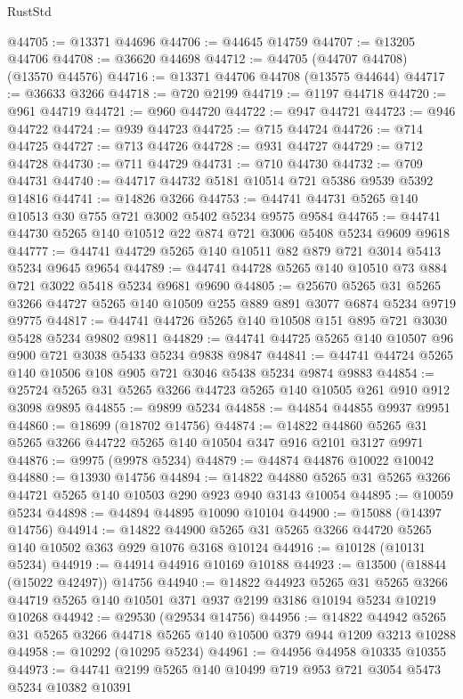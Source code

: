 \begin{lexlean}{RustStd}
\begin{coremodule}
@44705 := @13371 @44696
@44706 := @44645 @14759
@44707 := @13205 @44706
@44708 := @36620 @44698
@44712 := @44705 (@44707 @44708) (@13570 @44576)
@44716 := @13371 @44706 @44708 (@13575 @44644)
@44717 := @36633 @3266
@44718 := @720 @2199
@44719 := @1197 @44718
@44720 := @961 @44719
@44721 := @960 @44720
@44722 := @947 @44721
@44723 := @946 @44722
@44724 := @939 @44723
@44725 := @715 @44724
@44726 := @714 @44725
@44727 := @713 @44726
@44728 := @931 @44727
@44729 := @712 @44728
@44730 := @711 @44729
@44731 := @710 @44730
@44732 := @709 @44731
@44740 := @44717 @44732 @5181 @10514 @721 @5386 @9539 @5392 @14816
@44741 := @14826 @3266
@44753 := @44741 @44731 @5265 @140 @10513 @30 @755 @721 @3002 @5402 @5234 @9575 @9584
@44765 := @44741 @44730 @5265 @140 @10512 @22 @874 @721 @3006 @5408 @5234 @9609 @9618
@44777 := @44741 @44729 @5265 @140 @10511 @82 @879 @721 @3014 @5413 @5234 @9645 @9654
@44789 := @44741 @44728 @5265 @140 @10510 @73 @884 @721 @3022 @5418 @5234 @9681 @9690
@44805 := @25670
    @5265
    @31
    @5265
    @3266
    @44727
    @5265
    @140
    @10509
    @255
    @889
    @891
    @3077
    @6874
    @5234
    @9719
    @9775
@44817 := @44741 @44726 @5265 @140 @10508 @151 @895 @721 @3030 @5428 @5234 @9802 @9811
@44829 := @44741 @44725 @5265 @140 @10507 @96 @900 @721 @3038 @5433 @5234 @9838 @9847
@44841 := @44741 @44724 @5265 @140 @10506 @108 @905 @721 @3046 @5438 @5234 @9874 @9883
@44854 := @25724 @5265 @31 @5265 @3266 @44723 @5265 @140 @10505 @261 @910 @912 @3098 @9895
@44855 := @9899 @5234
@44858 := @44854 @44855 @9937 @9951
@44860 := @18699 (@18702 @14756)
@44874 := @14822 @44860 @5265 @31 @5265 @3266 @44722 @5265 @140 @10504 @347 @916 @2101 @3127 @9971
@44876 := @9975 (@9978 @5234)
@44879 := @44874 @44876 @10022 @10042
@44880 := @13930 @14756
@44894 := @14822 @44880 @5265 @31 @5265 @3266 @44721 @5265 @140 @10503 @290 @923 @940 @3143 @10054
@44895 := @10059 @5234
@44898 := @44894 @44895 @10090 @10104
@44900 := @15088 (@14397 @14756)
@44914 := @14822 @44900 @5265 @31 @5265 @3266 @44720 @5265 @140 @10502 @363 @929 @1076 @3168 @10124
@44916 := @10128 (@10131 @5234)
@44919 := @44914 @44916 @10169 @10188
@44923 := @13500 (@18844 (@15022 @42497)) @14756
@44940 := @14822
    @44923
    @5265
    @31
    @5265
    @3266
    @44719
    @5265
    @140
    @10501
    @371
    @937
    @2199
    @3186
    @10194
    @5234
    @10219
    @10268
@44942 := @29530 (@29534 @14756)
@44956 := @14822 @44942 @5265 @31 @5265 @3266 @44718 @5265 @140 @10500 @379 @944 @1209 @3213 @10288
@44958 := @10292 (@10295 @5234)
@44961 := @44956 @44958 @10335 @10355
@44973 := @44741 @2199 @5265 @140 @10499 @719 @953 @721 @3054 @5473 @5234 @10382 @10391

\end{coremodule}
\end{lexlean}
